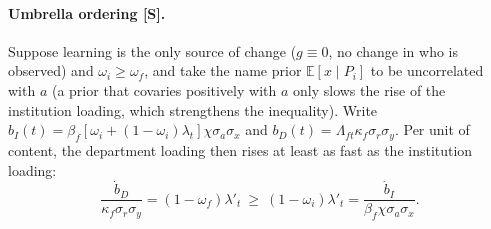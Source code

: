 \documentclass[11pt]{article}
\begin{document}
\paragraph{Umbrella ordering [S].} Suppose learning is the only source of change ($g\equiv0$, no change in who is
observed) and $\omega_i\ge\omega_f$, and take the name prior $\mathbb E[x\mid P_i]$ to be uncorrelated with $a$ (a
prior that covaries positively with $a$ only slows the rise of the institution loading, which strengthens the
inequality). Write $b_I(t)=\beta_f[\omega_i+(1-\omega_i)\lambda_t]\chi\sigma_a\sigma_x$ and
$b_D(t)=\Lambda_{ft}\kappa_f\sigma_r\sigma_y$. Per unit of content, the department loading then rises at least as
fast as the institution loading:
\[
\frac{\dot b_D}{\kappa_f\sigma_r\sigma_y}=(1-\omega_f)\lambda'_t\ \ge\ (1-\omega_i)\lambda'_t=\frac{\dot b_I}{\beta_f\chi\sigma_a\sigma_x} .
\]
\end{document}
